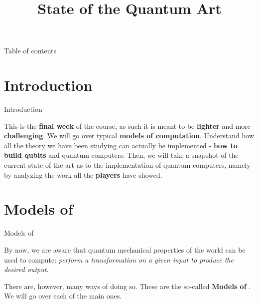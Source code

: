 \documentclass[aspectratio=43]{beamer}
\title{State of the Quantum Art}
\begin{document}
\begin{frame}
	\titlepage
\end{frame}


\begin{frame}{Table of contents}
	\begin{card}
		\tableofcontents
	\end{card}
\end{frame}

        

\section{Introduction}
\begin{frame}{Introduction}
    \begin{card}
        This is the \textbf{final week} of the course, as such it is meant to be \textbf{lighter} and more \textbf{challenging}. We will go over typical \textbf{models of computation}. Understand how all the theory we have been studying can actually be implemented - \textbf{how to build qubits} and quantum computers. Then, we will take a snapshot of the current state of the art as to the implementation of quantum computers, namely by analyzing the work all the \textbf{players} have showed.
    \end{card}
\pagenumber
\end{frame}

\section{Models of \qcp}
\begin{frame}{Models of \qcp}
    \begin{card}
        By now, we are aware that quantum mechanical properties of the world can be used to compute: \textit{perform a transformation on a given input to produce the desired output.}
    \end{card}
    \begin{card}
        There are, however, many ways of doing so. These are the so-called \textbf{Models of \qcp}. We will go over each of the main ones.
    \end{card}
\pagenumber
\end{frame}
\end{document}
